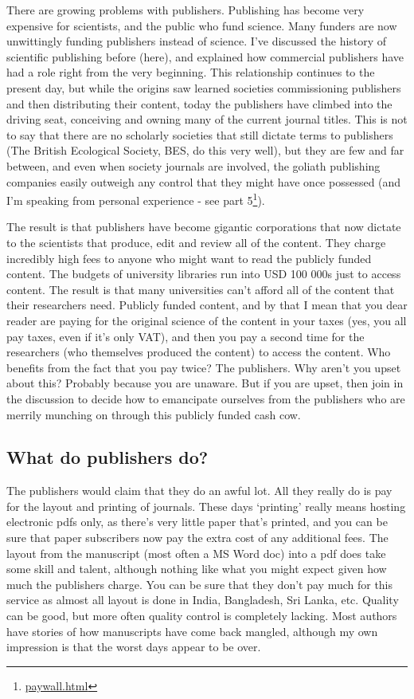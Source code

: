 \documentclass[
]{krantz}
\renewcommand{\href}[2]{#2\footnote{\url{#1}}}
\begin{document}
There are growing problems with publishers. Publishing has become very expensive for scientists, and the public who fund science. Many funders are now unwittingly funding publishers instead of science. I've discussed the history of scientific publishing before (here), and explained how commercial publishers have had a role right from the very beginning. This relationship continues to the present day, but while the origins saw learned societies commissioning publishers and then distributing their content, today the publishers have climbed into the driving seat, conceiving and owning many of the current journal titles. This is not to say that there are no scholarly societies that still dictate terms to publishers (The British Ecological Society, BES, do this very well), but they are few and far between, and even when society journals are involved, the goliath publishing companies easily outweigh any control that they might have once possessed (and I'm speaking from personal experience - \href{paywall.html}{see part 5}).

The result is that publishers have become gigantic corporations that now dictate to the scientists that produce, edit and review all of the content. They charge incredibly high fees to anyone who might want to read the publicly funded content. The budgets of university libraries run into USD 100 000s just to access content. The result is that many universities can't afford all of the content that their researchers need. Publicly funded content, and by that I mean that you dear reader are paying for the original science of the content in your taxes (yes, you all pay taxes, even if it's only VAT), and then you pay a second time for the researchers (who themselves produced the content) to access the content. Who benefits from the fact that you pay twice? The publishers. Why aren't you upset about this? Probably because you are unaware. But if you are upset, then join in the discussion to decide how to emancipate ourselves from the publishers who are merrily munching on through this publicly funded cash cow.

\hypertarget{what-do-publishers-do}{%
\subsection{What do publishers do?}\label{what-do-publishers-do}}

The publishers would claim that they do an awful lot. All they really do is pay for the layout and printing of journals. These days `printing' really means hosting electronic pdfs only, as there's very little paper that's printed, and you can be sure that paper subscribers now pay the extra cost of any additional fees. The layout from the manuscript (most often a MS Word doc) into a pdf does take some skill and talent, although nothing like what you might expect given how much the publishers charge. You can be sure that they don't pay much for this service as almost all layout is done in India, Bangladesh, Sri Lanka, etc. Quality can be good, but more often quality control is completely lacking. Most authors have stories of how manuscripts have come back mangled, although my own impression is that the worst days appear to be over.
\end{document}
